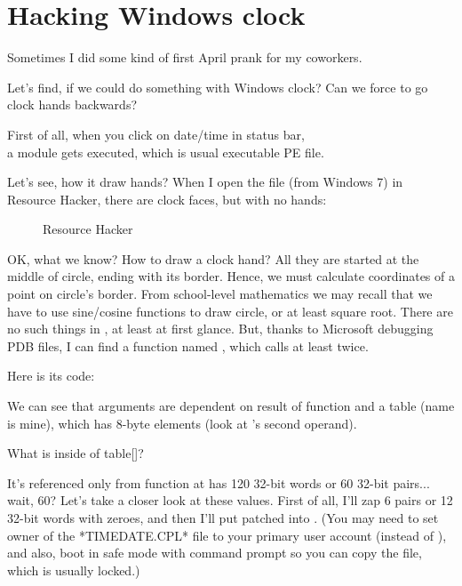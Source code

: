 \section{Hacking Windows clock}

Sometimes I did some kind of first April prank for my coworkers.

Let's find, if we could do something with Windows clock?
Can we force to go clock hands backwards?

First of all, when you click on date/time in status bar,\\
a  module gets executed,
which is usual executable PE file.

Let's see, how it draw hands?
When I open the file (from Windows 7) in Resource Hacker, there are clock faces, but with no hands:

\begin{figure}[H]
\centering
{}
\caption{Resource Hacker}
\end{figure}

OK, what we know? How to draw a clock hand? All they are started at the middle of circle, ending with its border.
Hence, we must calculate coordinates of a point on circle's border.
From school-level mathematics we may recall that we have to use sine/cosine functions to draw circle, or at least
square root.
There are no such things in , at least at first glance.
But, thanks to Microsoft debugging PDB files, I can find a function named , which calls
 at least twice.

Here is its code:



We can see that  arguments are dependent on result of  function
and a  table (name is mine),
which has 8-byte elements (look at 's second operand).

What is inside of table[]?



It's referenced only from  function at has 120 32-bit words or 60 32-bit pairs... wait, 60?
Let's take a closer look at these values.
First of all, I'll zap 6 pairs or 12 32-bit words with zeroes, and then I'll put patched 
into .
(You may need to set owner of the *TIMEDATE.CPL* file to your primary user account (instead of ),
and also, boot in safe mode with command prompt so you can copy the file, which is usually locked.)

